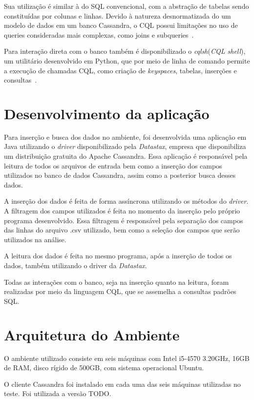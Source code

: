 Sua utilização é similar à do SQL convencional, com a abstração de tabelas sendo constituídas por colunas e linhas. Devido à natureza desnormatizada do um modelo de dados em um banco Cassandra, o CQL possui limitações no uso de queries consideradas mais complexas, como joins e subqueries~\cite{cassandracql}.

Para interação direta com o banco também é disponibilizado o \emph{cqlsh}(\emph{CQL shell}), um utilitário desenvolvido em Python, que por meio de linha de comando permite a execução de chamadas CQL, como criação de \emph{keyspaces}, tabelas, inserções e consultas~\cite{cassandra_intro_cql}.

\section{Desenvolvimento da aplicação}
Para inserção e busca dos dados no ambiente, foi desenvolvida uma aplicação em Java utilizando o \emph{driver} disponibilizado pela \emph{Datastax}, empresa que disponibiliza um distribuição gratuita do Apache Cassandra. Essa aplicação é responsável pela leitura de todos os arquivos de entrada bem como a inserção dos campos utilizados no banco de dados Cassandra, assim como a posterior busca desses dados.

A inserção dos dados é feita de forma assíncrona utilizando os métodos do \emph{driver}. A filtragem dos campos utilizados é feita no momento da inserção pelo próprio programa desenvolvido. Essa filtragem é responsável pela separação dos campos das linhas do arquivo .csv utilizado, bem como a seleção dos campos que serão utilizados na análise.

A leitura dos dados é feita no mesmo programa, após a inserção de todos os dados, também utilizando o driver da \emph{Datastax}.

Todas as interações com o banco, seja na inserção quanto na leitura, foram realizadas por meio da linguagem CQL, que se assemelha a consultas padrões SQL.

\section{Arquitetura do Ambiente}
O ambiente utilizado consiste em seis máquinas com Intel i5-4570 3.20GHz, 16GB de RAM, disco rígido de 500GB, com sistema operacional Ubuntu.

O cliente Cassandra foi instalado em cada uma das seis máquinas utilizadas no teste. Foi utilizada a versão TODO.

